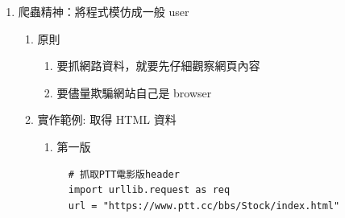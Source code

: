 \documentclass[a4paper,12pt]{article}
\begin{document}
\begin{enumerate}
\begin{enumerate}
\begin{figure}[htbp]
\end{figure}
\begin{itemize}
\item HTML 文件內不同的標籤 (例如 <title>, <h1>, <p>, <a>\\
\item 不同的標籤有著不同的語義，表示建構網頁用的不同元件，且標籤可以有各種屬性 (例如 id, class, style 等通用屬性, 或 href 等專屬屬性)，\\
\item 因此我們可以用標籤 + 屬性去定位資料所在的區塊並取得資料。\footnote{\href{http://blog.castman.net/\%E6\%95\%99\%E5\%AD\%B8/2016/12/22/python-data-science-tutorial-3.html}{給初學者的 Python 網頁爬蟲與資料分析 (3) 解構並擷取網頁資料}\\}\\
\end{itemize}
\item 爬蟲精神：將程式模仿成一般 user
\label{sec:org3842060}
\begin{enumerate}
\item 原則
\label{sec:orgad16959}
\begin{enumerate}
\item 要抓網路資料，就要先仔細觀察網頁內容\\
\item 要儘量欺騙網站自己是 browser\\
\end{enumerate}
\item 實作範例: 取得 HTML 資料
\label{sec:org527532a}
\begin{enumerate}
\item 第一版
\label{sec:org7727f04}
\lstset{breaklines=true,language=Python,label= ,caption= ,captionpos=b,firstnumber=1,numbers=left}
\begin{lstlisting}
  # 抓取PTT電影版header
  import urllib.request as req
  url = "https://www.ptt.cc/bbs/Stock/index.html"


\end{lstlisting}
\end{enumerate}
\end{enumerate}
\end{enumerate}
\end{enumerate}
\end{document}
